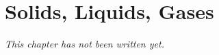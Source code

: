 \chapter{Solids, Liquids, Gases}\label{ch:g3:solids-liquids-gases}


\emph{This chapter has not been written yet.}
